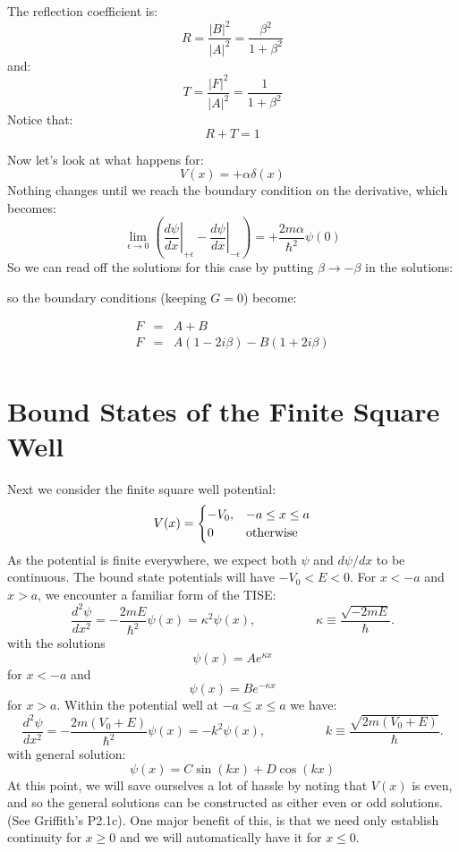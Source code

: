 \documentclass[12pt]{book}
\begin{document}
The reflection coefficient is:
$$R = \frac{|B|^2}{|A|^2} = \frac{\beta^2}{1+\beta^2}$$
and:
$$T = \frac{|F|^2}{|A|^2} = \frac{1}{1+\beta^2}$$
Notice that:
$$R+T=1$$

Now let's look at what happens for:
$$V(x) = +\alpha \delta(x)$$
Nothing changes until we reach the boundary condition on the derivative, which becomes:
$$
\lim_{\epsilon \to 0} \left( \left. \frac{d\psi}{d x} \right\rvert_{+\epsilon} 
- \left. \frac{d\psi}{d x} \right\rvert_{-\epsilon} \right) = 
+\frac{2m\alpha}{\hbar^2} \psi(0) 
$$
So we can read off the solutions for this case by putting $\beta \to -\beta$ in the solutions:


so the boundary conditions (keeping $G=0$) become:

\begin{eqnarray*}
F &=& A+B \\
F &=& A (1-2i\beta) - B (1+2i\beta)\\
\end{eqnarray*}

\section{Bound States of the Finite Square Well}

Next we consider the finite square well potential:
$$V(x) = \begin{cases}
-V_0, & -a \leq x \leq a \\
0     & {\rm otherwise} \\
\end{cases}
$$
As the potential is finite everywhere, we expect both $\psi$ and $d\psi/dx$ to be continuous.
The bound state potentials will have $-V_0 < E < 0$.  For $x < -a$ and $x > a$, we encounter a familiar form of the TISE:
\begin{equation*}
\frac{d^2 \psi}{d x^2} = -\frac{2mE}{\hbar^2}\psi(x) = \kappa^2 \psi(x), \hspace{2cm} \kappa \equiv \frac{\sqrt{-2mE}}{\hbar}.
\end{equation*}
with the solutions
$$\psi(x) = A e^{\displaystyle \kappa x}$$
for $x<-a$ and
$$\psi(x) = B e^{\displaystyle -\kappa x}$$
for $x>a$.  Within the potential well at $-a \leq x \leq a$ we have:
\begin{equation*}
\frac{d^2 \psi}{d x^2} = -\frac{2m(V_0+E)}{\hbar^2}\psi(x) = -k^2 \psi(x), \hspace{2cm} k \equiv \frac{\sqrt{2m(V_0 + E)}}{\hbar}.
\end{equation*}
with general solution:
$$\psi(x) = C \sin(kx) + D \cos(kx)$$
At this point, we will save ourselves a lot of hassle by noting that $V(x)$ is even, and so the general solutions can be constructed as either even or odd solutions. (See Griffith's P2.1c).
One major benefit of this, is that we need only establish continuity for $x \geq 0$ and we will automatically have it for $x \leq 0$.
\end{document}
